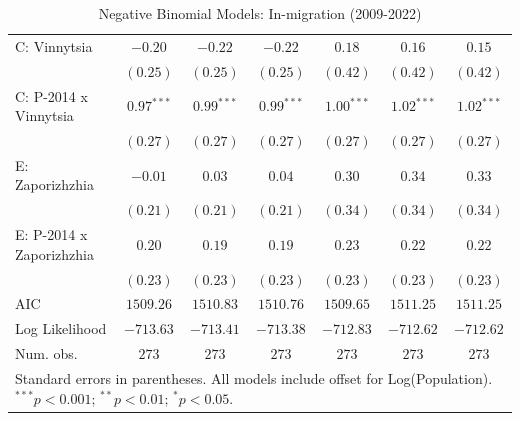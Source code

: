 \begin{table}
\begin{center}
\begin{small}
\begin{tabular}{l c c c c c c}
C: Vinnytsia                & $-0.20$       & $-0.22$       & $-0.22$       & $0.18$       & $0.16$       & $0.15$       \\
                            & $(0.25)$      & $(0.25)$      & $(0.25)$      & $(0.42)$     & $(0.42)$     & $(0.42)$     \\
C: P-2014 x Vinnytsia       & $0.97^{***}$  & $0.99^{***}$  & $0.99^{***}$  & $1.00^{***}$ & $1.02^{***}$ & $1.02^{***}$ \\
                            & $(0.27)$      & $(0.27)$      & $(0.27)$      & $(0.27)$     & $(0.27)$     & $(0.27)$     \\
E: Zaporizhzhia             & $-0.01$       & $0.03$        & $0.04$        & $0.30$       & $0.34$       & $0.33$       \\
                            & $(0.21)$      & $(0.21)$      & $(0.21)$      & $(0.34)$     & $(0.34)$     & $(0.34)$     \\
E: P-2014 x Zaporizhzhia    & $0.20$        & $0.19$        & $0.19$        & $0.23$       & $0.22$       & $0.22$       \\
                            & $(0.23)$      & $(0.23)$      & $(0.23)$      & $(0.23)$     & $(0.23)$     & $(0.23)$     \\
\hline
AIC                         & $1509.26$     & $1510.83$     & $1510.76$     & $1509.65$    & $1511.25$    & $1511.25$    \\
Log Likelihood              & $-713.63$     & $-713.41$     & $-713.38$     & $-712.83$    & $-712.62$    & $-712.62$    \\
Num. obs.                   & $273$         & $273$         & $273$         & $273$        & $273$        & $273$        \\
\hline
\multicolumn{7}{l}{\tiny{Standard errors in parentheses. All models include offset for Log(Population). $^{***}p<0.001$; $^{**}p<0.01$; $^{*}p<0.05$.}}
\end{tabular}
\end{small}
\caption{Negative Binomial Models: In-migration (2009-2022)}
\label{tab:in_migration}
\end{center}
\end{table}
